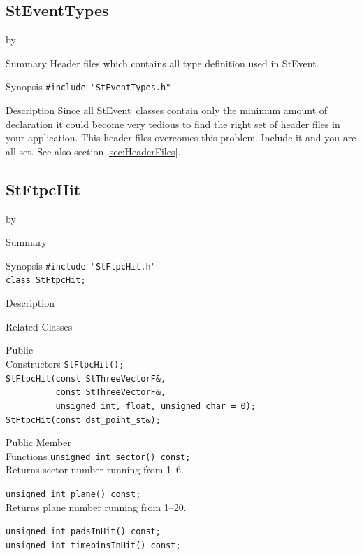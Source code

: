 \documentclass[twoside]{article}
\newcommand{\StEvent}{\textsf{StEvent}}
\newcommand{\entrylabel}[1]{\mbox{\textbf{{#1}}}\hfil}%
\newenvironment{entry}
{\begin{list}{}%
    {\renewcommand{\makelabel}{\entrylabel}%
     \setlength{\labelwidth}{90pt}%
     \setlength{\leftmargin}{\labelwidth}
     \advance\leftmargin by \labelsep%
      }%
    }%
  {\end{list}}
\newcommand{\Entrylabel}[1]%
{\raisebox{0pt}[1ex][0pt]{\makebox[\labelwidth][l]%
    {\parbox[t]{\labelwidth}{\hspace{0pt}\textbf{{#1}}}}}}
\newenvironment{Entry}%
{\renewcommand{\entrylabel}{\Entrylabel}\begin{entry}}%
  {\end{entry}}
\begin{document}
\subsection{StEventTypes}
\label{sec:StEventTypes}
\begin{Entry}
\item[Summary] Header files which contains all type definition used in
    \StEvent.
\item[Synopsis]
    \verb+#include "StEventTypes.h"+\\
\item[Description] Since all \StEvent\ classes contain only the
    minimum amount of declaration it could become very tedious to find
    the right set of header files in your application.  This header
    files overcomes this problem. Include it and you are all set.  See
    also section \ref{sec:HeaderFiles}.
\end{Entry}
\clearpage


\subsection{StFtpcHit}
\label{sec:StFtpcHit}
\begin{Entry}
\item[Summary]
\item[Synopsis]
    \verb+#include "StFtpcHit.h"+\\
    \verb+class StFtpcHit;+\\
\item[Description]
\item[Related Classes]
\item[Public\\ Constructors]
    \verb+StFtpcHit();+\\

    \verb+StFtpcHit(const StThreeVectorF&,+\\
    \verb+          const StThreeVectorF&,+\\
    \verb+          unsigned int, float, unsigned char = 0);+\\

    \verb+StFtpcHit(const dst_point_st&);+\\
\item[Public Member\\ Functions]
    \verb+unsigned int sector() const;+\\
    Returns sector number running from 1--6.
    
    \verb+unsigned int plane() const;+\\
    Returns plane number running from 1--20.      

    \verb+unsigned int padsInHit() const;+\\
    \verb+unsigned int timebinsInHit() const;+\\
\end{Entry}
\clearpage
\end{document}
